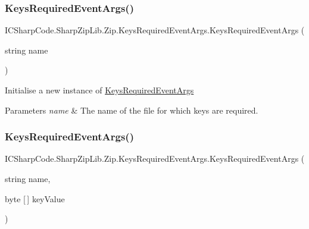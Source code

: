 \subsubsection{\texorpdfstring{Keys\+Required\+Event\+Args()}{KeysRequiredEventArgs()}\hspace{0.1cm}{\footnotesize\ttfamily [1/2]}}
{\footnotesize\ttfamily I\+C\+Sharp\+Code.\+Sharp\+Zip\+Lib.\+Zip.\+Keys\+Required\+Event\+Args.\+Keys\+Required\+Event\+Args (\begin{DoxyParamCaption}\item[{string}]{name }\end{DoxyParamCaption})\hspace{0.3cm}{\ttfamily [inline]}}



Initialise a new instance of \hyperlink{class_i_c_sharp_code_1_1_sharp_zip_lib_1_1_zip_1_1_keys_required_event_args}{Keys\+Required\+Event\+Args} 


\begin{DoxyParams}{Parameters}
{\em name} & The name of the file for which keys are required.\\
\hline
\end{DoxyParams}
\mbox{\label{class_i_c_sharp_code_1_1_sharp_zip_lib_1_1_zip_1_1_keys_required_event_args_a3d587063c33b6085a39f44ecae28add4}} 
\subsubsection{\texorpdfstring{Keys\+Required\+Event\+Args()}{KeysRequiredEventArgs()}\hspace{0.1cm}{\footnotesize\ttfamily [2/2]}}
{\footnotesize\ttfamily I\+C\+Sharp\+Code.\+Sharp\+Zip\+Lib.\+Zip.\+Keys\+Required\+Event\+Args.\+Keys\+Required\+Event\+Args (\begin{DoxyParamCaption}\item[{string}]{name,  }\item[{byte \mbox{[}$\,$\mbox{]}}]{key\+Value }\end{DoxyParamCaption})\hspace{0.3cm}{\ttfamily [inline]}}



